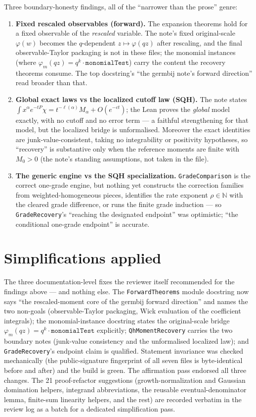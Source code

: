 \documentclass[11pt]{article}
\begin{document}
Three boundary-honesty findings, all of the ``narrower than the
prose'' genre:

\begin{enumerate}[leftmargin=2em]
\item \textbf{Fixed rescaled observables (forward).} The expansion
theorems hold for a fixed observable of the \emph{rescaled} variable.
The note's fixed original-scale $\varphi(w)$ becomes the $q$-dependent
$z \mapsto \varphi(qz)$ after rescaling, and the final
observable-Taylor packaging is not in these files; the monomial
instances (where $\varphi_m(qz) = q^k\cdot\texttt{monomialTest}$)
carry the content the recovery theorems consume. The top docstring's
``the germbij note's forward direction'' read broader than that.
\item \textbf{Global exact laws vs the localized cutoff law (SQH).}
The note states $\int x^\alpha e^{-tP}\chi = t^{-\ell(\alpha)}M_\alpha
+ O(e^{-ct})$; the Lean proves the \emph{global} model exactly, with
no cutoff and no error term --- a faithful strengthening for that
model, but the localized bridge is unformalised. Moreover the exact
identities are junk-value-consistent, taking no integrability or
positivity hypotheses, so ``recovery'' is substantive only when the
reference moments are finite with $M_0 > 0$ (the note's standing
assumptions, not taken in the file).
\item \textbf{The generic engine vs the SQH specialization.}
\texttt{GradeComparison} is the correct one-grade engine, but nothing
yet constructs the correction families from weighted-homogeneous
pieces, identifies the rate exponent $\rho \in \mathbb{N}$ with the
cleared grade difference, or runs the finite grade induction ---
so \texttt{GradeRecovery}'s ``reaching the designated endpoint'' was
optimistic; ``the conditional one-grade endpoint'' is accurate.
\end{enumerate}

\section{Simplifications applied}

The three documentation-level fixes the reviewer itself recommended
for the findings above --- and nothing else. The
\texttt{ForwardTheorems} module docstring now says ``the
rescaled-moment core of the germbij forward direction'' and names the
two non-goals (observable-Taylor packaging, Wick evaluation of the
coefficient integrals); the monomial-instance docstring states the
original-scale bridge $\varphi_m(qz) = q^k\cdot\texttt{monomialTest}$
explicitly; \texttt{QhMomentRecovery} carries the two boundary notes
(junk-value consistency and the unformalised localized law); and
\texttt{GradeRecovery}'s endpoint claim is qualified. Statement
invariance was checked mechanically (the public-signature fingerprint
of all seven files is byte-identical before and after) and the build
is green. The affirmation pass endorsed all three changes. The 21
proof-refactor suggestions (growth-normalization and Gaussian
domination helpers, integrand abbreviations, the reusable
eventual-denominator lemma, finite-sum linearity helpers, and the
rest) are recorded verbatim in the review log as a batch for a
dedicated simplification pass.
\end{document}
